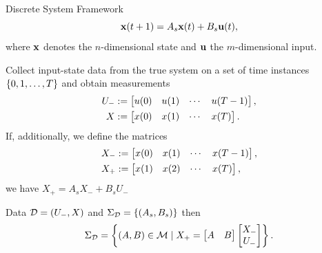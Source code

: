 \documentclass[aspectratio=169, handout, 10pt, hyperref=colorlinks]{beamer}
\begin{document}
\begin{frame}{Discrete System Framework}
    \begin{equation} \label{ch2:eq:true system once more}
    \mathbf{x}(t+1) = A_s\mathbf{x}(t) + B_s\mathbf{u}(t),
    \end{equation}
where $\mathbf{x}$ denotes the $n$-dimensional state and $\mathbf{u}$ the $m$-dimensional input.

Collect input-state data from the true system on a set of time instances $\{0,1,\ldots,T\}$ and obtain measurements
\begin{subequations}\label{ch2:eq: UXdata}
    \begin{align}
        U_-& := \begin{bmatrix} u(0) & u(1) & \cdots & u(T-1)\end{bmatrix}, \\
        X& := \begin{bmatrix} x(0) & x(1) & \cdots & x(T)\end{bmatrix}.
    \end{align}
\end{subequations}
If, additionally, we define the matrices
\begin{subequations}\label{ch2:eq: def of X- X+}
    \begin{align}
        X_-& := \begin{bmatrix} x(0) & x(1) & \cdots & x(T-1) \end{bmatrix}, \\
        X_+& := \begin{bmatrix} x(1) & x(2) & \cdots & x(T) \end{bmatrix},
    \end{align} 
\end{subequations}
we have $X_+=A_sX_-+B_sU_-$

Data $\mathcal{D} = (U_-,X)$ and $\Sigma_{\mathcal{D}} = \{(A_s,B_s)\}$ then
\begin{equation}\label{ch2:eq:SigmaD}
    \Sigma_{\mathcal{D}} = \left\{ (A,B) \in \mathcal{M} \mid X_+= \begin{bmatrix} A&B \end{bmatrix}
    \begin{bmatrix}
        X_-\\U_-
    \end{bmatrix} \right\}. 
\end{equation}
\end{frame}
\end{document}
